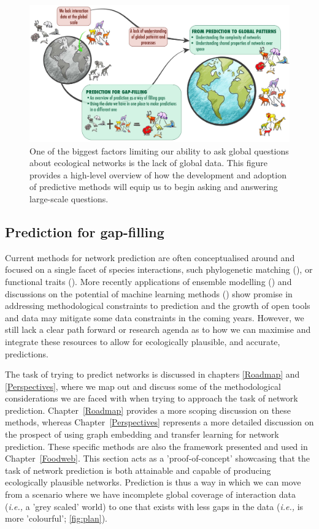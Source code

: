 \begin{refsection}
\begin{figure}[h]
    \centering
    \includegraphics[width=\textwidth]{figures/thesis-flowchart.jpg}
    \caption{One of the biggest factors limiting our ability to ask global questions about ecological networks is the lack of global data. This figure provides a high-level overview of how the development and adoption of predictive methods will equip us to begin asking and answering large-scale questions.}
    \label{fig:plan}
\end{figure}

\subsection{Prediction for gap-filling}

Current methods for network prediction are often conceptualised around and focused on a single facet of species interactions, such phylogenetic matching (\cite{Pomeranz2018InfPre, Elmasri2020HieBay}), or functional traits (\cite{Bartomeus2016ComFra}). More recently applications of ensemble modelling (\cite{Becker2020PreWil}) and discussions on the potential of machine learning methods (\cite{Desjardins-Proulx2019ArtInt}) show promise in addressing methodological constraints to prediction and the growth of open tools and data may mitigate some data constraints in the coming years. However, we still lack a clear path forward or research agenda as to how we can maximise and integrate these resources to allow for ecologically plausible, and accurate, predictions.

The task of trying to predict networks is discussed in chapters \ref{Roadmap} and \ref{Perspectives}, where we map out and discuss some of the methodological considerations we are faced with when trying to approach the task of network prediction. Chapter~\ref{Roadmap} provides a more scoping discussion on these methods, whereas Chapter~\ref{Perspectives} represents a more detailed discussion on the prospect of using graph embedding and transfer learning for network prediction. These specific methods are also the framework presented and used in Chapter~\ref{Foodweb}. This section acts as a 'proof-of-concept' showcasing that the task of network prediction is both attainable and capable of producing ecologically plausible networks. Prediction is thus a way in which we can move from a scenario where we have incomplete global coverage of interaction data (\emph{i.e.,} a 'grey scaled' world) to one that exists with less gaps in the data (\emph{i.e.,} is more 'colourful'; \autoref{fig:plan}).


\end{refsection}
